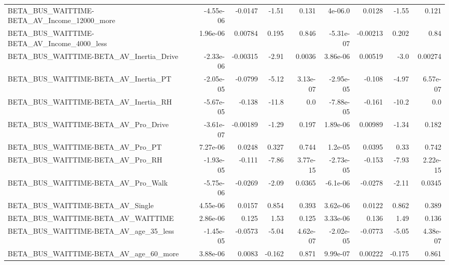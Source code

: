 \begin{tabular}{lrrrrrrrr}
BETA\_BUS\_WAITTIME-BETA\_AV\_Income\_12000\_more        &   -4.55e-06 &      -0.0147 &    -1.51 &    0.131 &    4e-06.0 &      0.0128 &        -1.55 &         0.121 \\
BETA\_BUS\_WAITTIME-BETA\_AV\_Income\_4000\_less         &    1.96e-06 &      0.00784 &    0.195 &    0.846 &  -5.31e-07 &    -0.00213 &        0.202 &          0.84 \\
BETA\_BUS\_WAITTIME-BETA\_AV\_Inertia\_Drive            &   -2.33e-06 &     -0.00315 &    -2.91 &   0.0036 &   3.86e-06 &     0.00519 &         -3.0 &       0.00274 \\
BETA\_BUS\_WAITTIME-BETA\_AV\_Inertia\_PT               &   -2.05e-05 &      -0.0799 &    -5.12 & 3.13e-07 &  -2.95e-05 &      -0.108 &        -4.97 &      6.57e-07 \\
BETA\_BUS\_WAITTIME-BETA\_AV\_Inertia\_RH               &   -5.67e-05 &       -0.138 &    -11.8 &      0.0 &  -7.88e-05 &      -0.161 &        -10.2 &           0.0 \\
BETA\_BUS\_WAITTIME-BETA\_AV\_Pro\_Drive                &   -3.61e-07 &     -0.00189 &    -1.29 &    0.197 &   1.89e-06 &     0.00989 &        -1.34 &         0.182 \\
BETA\_BUS\_WAITTIME-BETA\_AV\_Pro\_PT                   &    7.27e-06 &       0.0248 &    0.327 &    0.744 &    1.2e-05 &      0.0395 &         0.33 &         0.742 \\
BETA\_BUS\_WAITTIME-BETA\_AV\_Pro\_RH                   &   -1.93e-05 &       -0.111 &    -7.86 & 3.77e-15 &  -2.73e-05 &      -0.153 &        -7.93 &      2.22e-15 \\
BETA\_BUS\_WAITTIME-BETA\_AV\_Pro\_Walk                 &   -5.75e-06 &      -0.0269 &    -2.09 &   0.0365 &   -6.1e-06 &     -0.0278 &        -2.11 &        0.0345 \\
BETA\_BUS\_WAITTIME-BETA\_AV\_Single                   &    4.55e-06 &       0.0157 &    0.854 &    0.393 &   3.62e-06 &      0.0122 &        0.862 &         0.389 \\
BETA\_BUS\_WAITTIME-BETA\_AV\_WAITTIME                 &    2.86e-06 &        0.125 &     1.53 &    0.125 &   3.33e-06 &       0.136 &         1.49 &         0.136 \\
BETA\_BUS\_WAITTIME-BETA\_AV\_age\_35\_less              &   -1.45e-05 &      -0.0573 &    -5.04 & 4.62e-07 &  -2.02e-05 &     -0.0773 &        -5.05 &      4.38e-07 \\
BETA\_BUS\_WAITTIME-BETA\_AV\_age\_60\_more              &    3.88e-06 &       0.0083 &   -0.162 &    0.871 &   9.99e-07 &     0.00222 &       -0.175 &         0.861 \\

\end{tabular}
